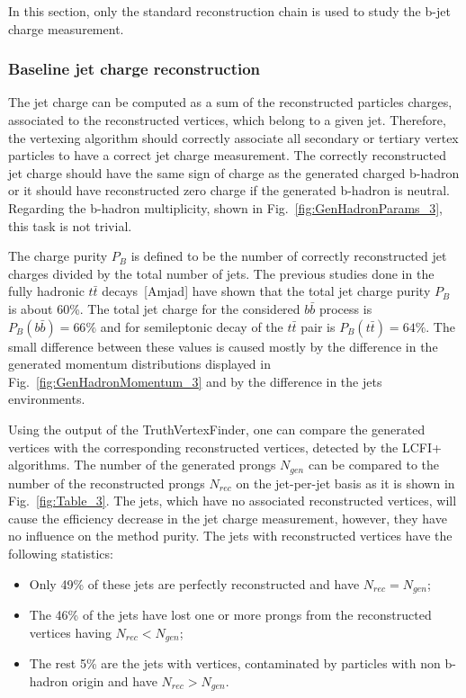 In this section, only the standard reconstruction chain is used to study the b-jet charge measurement. 

\subsubsection{Baseline jet charge reconstruction}
The jet charge can be computed as a sum of the reconstructed particles charges, associated to the reconstructed vertices, which belong to a given jet. 
Therefore, the vertexing algorithm should correctly associate all secondary or tertiary vertex particles to have a correct jet charge measurement. 
The correctly reconstructed jet charge should have the same sign of charge as the generated charged b-hadron or it should have reconstructed zero charge if the generated b-hadron is neutral. 
Regarding the b-hadron multiplicity, shown in Fig.~\ref{fig:GenHadronParams_3}, this task is not trivial. 


The charge purity $P_B$ is defined to be the number of correctly reconstructed jet charges divided by the total number of jets. 
The previous studies done in the fully hadronic $t\bar{t}$ decays~[Amjad] have shown that the total jet charge purity $P_B$ is about 60\%.
The total jet charge for the considered $b\bar{b}$ process  is $P_B(b\bar{b}) = 66\%$ and for semileptonic decay of the  $t\bar{t}$ pair is $P_B(t\bar{t}) = 64\%$. 
The small difference between these values is caused mostly by the difference in the generated momentum  distributions displayed in Fig.~\ref{fig:GenHadronMomentum_3} and by the difference in the jets environments.

Using the output of the TruthVertexFinder, one can compare the generated vertices with the corresponding reconstructed vertices, detected by the LCFI+ algorithms. 
The number of the generated prongs $N_{gen}$ can be compared to the number of the reconstructed prongs $N_{rec}$ on the jet-per-jet basis as it is shown in Fig.~\ref{fig:Table_3}. 
The jets, which have no associated reconstructed vertices, will cause the efficiency decrease in the jet charge measurement, however, they have no influence on the method purity.
The jets with reconstructed vertices have the following statistics:
\begin{itemize}
\item Only 49\% of these jets are perfectly reconstructed and have $N_{rec}=N_{gen}$;
\item The 46\% of the jets have lost one or more prongs from the reconstructed vertices having $N_{rec}<N_{gen}$;
\item The rest 5\% are the jets with vertices, contaminated by particles with non b-hadron origin and have $N_{rec}>N_{gen}$.
\end{itemize}

